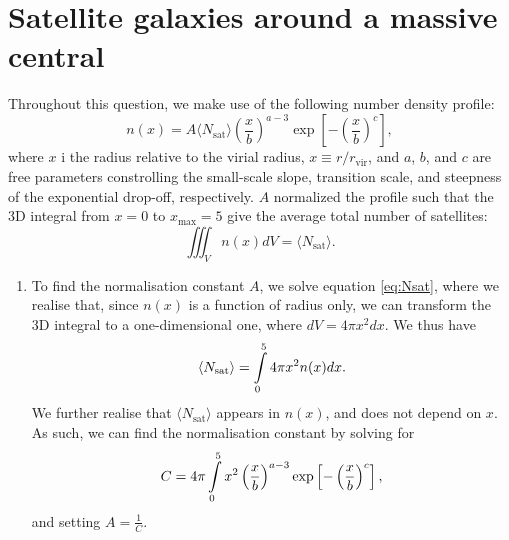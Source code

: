 \section{Satellite galaxies around a massive central}
Throughout this question, we make use of the following number density profile:
\begin{equation}
	n(x) = A\langle N_\text{sat}\rangle \left(\frac{x}{b}\right)^{a-3} \exp\left[-\left(\frac{x}{b}\right)^c\right],
\end{equation}
where $x$ i the radius relative to the virial radius, $x\equiv r/r_\text{vir}$, and $a$, $b$, and $c$ are free parameters constrolling the small-scale slope, transition scale, and steepness of the exponential drop-off, respectively. $A$ normalized the profile such that the 3D integral from $x=0$ to $x_\text{max}=5$ give the average total number of satellites:
\begin{equation}
	\iiint_V n(x)dV = \langle N_\text{sat}\rangle.
	\label{eq:Nsat}
\end{equation}

\begin{enumerate}[label=(\alph*)]
\item {
	To find the normalisation constant $A$, we solve equation \eqref{eq:Nsat}, where we realise that, since $n(x)$ is a function of radius only, we can transform the 3D integral to a one-dimensional one, where $dV = 4\pi x^2 dx$. We thus have
\begin{equation}
	\langle N_\text{sat}\rangle = \int\limits_{0}^{5} 4\pi x^2 n(x) dx.
\end{equation}
We further realise that $\langle N_\text{sat} \rangle$ appears in $n(x)$, and does not depend on $x$. As such, we can find the normalisation constant by solving for
\begin{equation}
	C = 4\pi\int\limits_{0}^{5} x^2 \left(\frac{x}{b}\right)^{a-3} \exp\left[-\left(\frac{x}{b}\right)^c\right],
\end{equation}
and setting $A = \frac{1}{C}$.
}
\end{enumerate}
